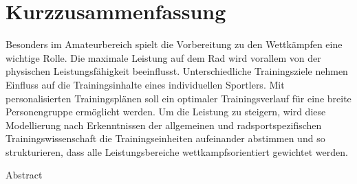 \chapter*{Kurzzusammenfassung}
\label{sec:abstract}
\vspace*{-10mm}
Besonders im Amateurbereich spielt die Vorbereitung zu den Wettkämpfen eine wichtige Rolle. Die maximale Leistung auf dem Rad wird vorallem von der physischen Leistungsfähigkeit beeinflusst. Unterschiedliche Trainingsziele nehmen Einfluss auf die Trainingsinhalte eines individuellen Sportlers. Mit personalisierten Trainingsplänen soll ein optimaler Trainingsverlauf für eine breite Personengruppe ermöglicht werden.
Um die Leistung zu steigern, wird diese Modellierung nach Erkenntnissen der allgemeinen und radsportspezifischen Trainingswissenschaft die Trainingseinheiten aufeinander abstimmen und so strukturieren, dass alle Leistungsbereiche wettkampfsorientiert gewichtet werden.
\vspace*{20mm}

{Abstract}\label{sec:abstract-diff} \\
\vspace*{-10mm}
